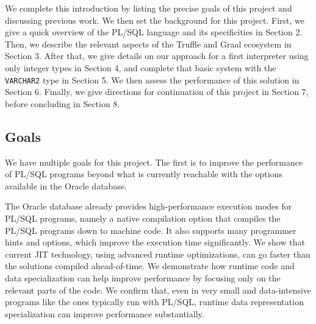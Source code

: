 \documentclass[twoside,11pt,a4paper]{article}
\newcommand{\pls}[1]{\small\texttt{#1}\normalsize}
\newcommand{\plstype}[1]{\pls{#1}}
\newcommand{\varchar}{\plstype{VARCHAR2}}
\begin{document}
We complete this introduction by listing the precise goals of this project and discussing previous work. We then set the background for this project. First, we give a quick overview of the PL/SQL language and its specificities in Section 2. Then, we describe the relevant aspects of the Truffle and Graal ecosystem in Section 3. After that, we give details on our approach for a first interpreter using only integer types in Section 4, and complete that basic system with the \varchar{} type in Section 5. We then assess the performance of this solution in Section 6. Finally, we give directions for continuation of this project in Section 7, before concluding in Section 8.

\subsection{Goals}


We have multiple goals for this project. The first is to improve the performance of PL/SQL programs beyond what is currently reachable with the options available in the Oracle database.

The Oracle database already provides high-performance execution modes for PL/SQL programs, namely a native compilation option that compiles the PL/SQL programs down to machine code. It also supports many programmer hints and options, which improve the execution time significantly. We show that current JIT technology, using advanced runtime optimizations, can go faster than the solutions compiled ahead-of-time. We demonstrate how runtime code and data specialization can help improve performance by focusing only on the relevant parts of the code. We confirm that, even in very small and data-intensive programs like the ones typically run with PL/SQL, runtime data representation specialization can improve performance substantially.
\end{document}
